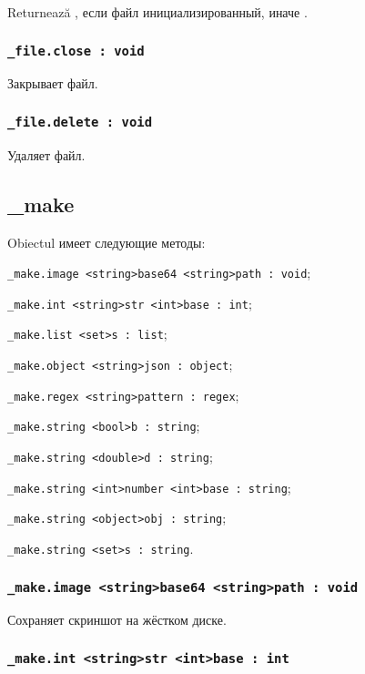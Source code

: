 Returnează \true, если файл инициализированный, иначе \false.

\subsubsection{\lstinline|_file.close : void|}

Закрывает файл.

\subsubsection{\lstinline|_file.delete : void|}

Удаляет файл.

\subsection{{\color{orange} \_make}}

Obiectul \make{} имеет следующие методы:
\begin{icItems}
	\item \lstinline|_make.image <string>base64 <string>path : void|;
	\item \lstinline|_make.int <string>str <int>base : int|;
	\item \lstinline|_make.list <set>s : list|;
	\item \lstinline|_make.object <string>json : object|;
	\item \lstinline|_make.regex <string>pattern : regex|;
	\item \lstinline|_make.string <bool>b : string|;
	\item \lstinline|_make.string <double>d : string|;
	\item \lstinline|_make.string <int>number <int>base : string|;
	\item \lstinline|_make.string <object>obj : string|;
	\item \lstinline|_make.string <set>s : string|.
\end{icItems}

\subsubsection{\lstinline|_make.image <string>base64 <string>path : void|}

Сохраняет скриншот на жёстком диске.

\subsubsection{\lstinline|_make.int <string>str <int>base : int|}


